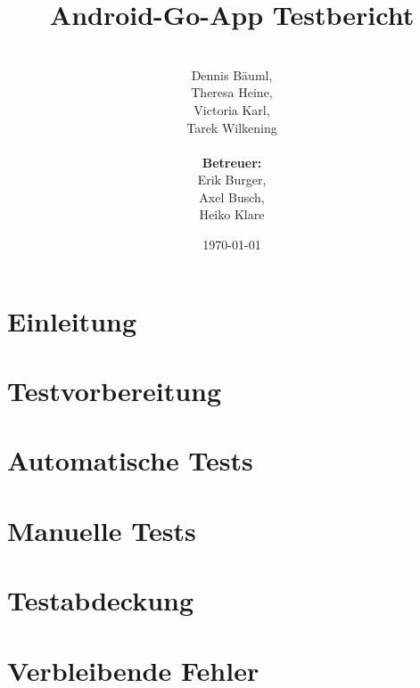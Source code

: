 \documentclass[parskip=full]{scrartcl}
\begin{document}
	\title{Android-Go-App Testbericht}
	\author{\\Dennis Bäuml,\\Theresa Heine,\\ Victoria Karl, \\ Tarek Wilkening\\
		\\ \textbf{Betreuer:} \\Erik Burger, \\Axel Busch, \\Heiko Klare \\}

	\date{\today}
	\maketitle
	\newpage
	\tableofcontents
	\newpage

	\section{Einleitung}
	
	\clearpage
	\section{Testvorbereitung}
	
	\clearpage
	\section{Automatische Tests}
	
	\clearpage
	\section{Manuelle Tests}
	 
	\clearpage
	\section{Testabdeckung}
	
	\clearpage
	\section{Verbleibende Fehler}
	
	\clearpage
\end{document}

